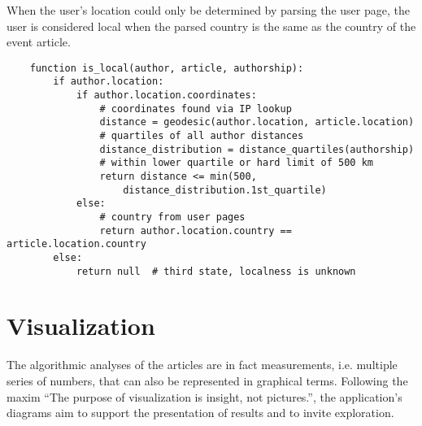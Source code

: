When the user's location could only be determined by parsing the user page, the user is considered local when the parsed country is the same as the country of the event article.

\begin{lstlisting}
	function is_local(author, article, authorship):
		if author.location:
			if author.location.coordinates:
				# coordinates found via IP lookup
				distance = geodesic(author.location, article.location)
				# quartiles of all author distances
				distance_distribution = distance_quartiles(authorship) 
				# within lower quartile or hard limit of 500 km
				return distance <= min(500, 
					distance_distribution.1st_quartile)
			else: 
				# country from user pages
				return author.location.country == article.location.country
		else:
			return null	 # third state, localness is unknown
\end{lstlisting}

\section{Visualization}\label{sec:visualization}

The algorithmic analyses of the articles are in fact measurements, i.e. multiple series of numbers, that can also be represented in graphical terms.
Following the maxim ``The purpose of visualization is insight, not pictures.''\cite[6]{card1999readings}, the application's diagrams aim to support the presentation of results and to invite exploration.


